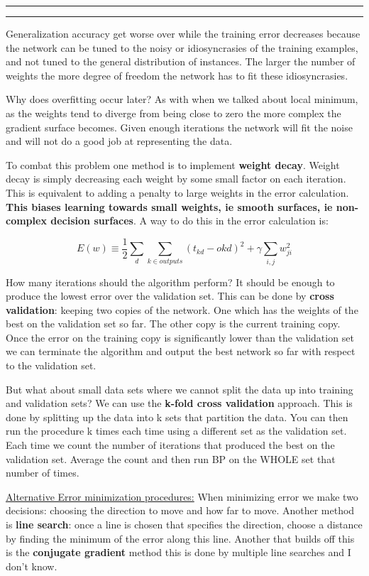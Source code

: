 \documentclass[11pt]{article}
\newcounter{questionCounter}
\newcounter{partCounter}[questionCounter]
\newenvironment{question}[2][\arabic{questionCounter}]{%
    \addtocounter{questionCounter}{1}%
    \setcounter{partCounter}{0}%
    \vspace{.25in} \hrule \vspace{0.5em}%
        \noindent{\bf #1: #2}%
    \vspace{0.8em} \hrule \vspace{.10in}%
}{}
\begin{document}
\begin{question}{Artificial Neural Networks: }
Generalization accuracy get worse over while the training error decreases because the network
can be tuned to the noisy or idiosyncrasies of the training examples, and not tuned to the general
distribution of instances. The larger the number of weights the more degree of freedom the network
has to fit these idiosyncrasies.

Why does overfitting occur later? As with when we talked about local minimum, as the weights tend to
diverge from being close to zero the more complex the gradient surface becomes. Given enough iterations
the network will fit the noise and will not do a good job at representing the data.

To combat this problem one method is to implement \textbf{weight decay}. Weight decay is simply decreasing each
weight by some small factor on each iteration. This is equivalent to adding a penalty to large weights in
the error calculation. \textbf{This biases learning towards small weights, ie smooth surfaces, ie non-complex
decision surfaces}. A way to do this in the error calculation is:





$$E(w) \equiv \frac{1}{2} \displaystyle\sum\limits_{d} \displaystyle\sum\limits_{k\in outputs}(t_{kd} - o{kd})^2 + \gamma
\displaystyle\sum\limits_{i,j}w_{ji}^2$$

How many iterations should the algorithm perform? It should be enough to produce the lowest error over
the validation set. This can be done by \textbf{cross validation}: keeping two copies of the network. One which has the weights of
the best on the validation set so far. The other copy is the current training copy. Once the error
on the training copy is significantly lower than the validation set we can terminate the algorithm
and output the best network so far with respect to the validation set.

But what about small data sets where we cannot split the data up into training and validation sets? We can
use the \textbf{k-fold cross validation} approach. This is done by splitting up the data into k sets that
partition the data. You can then run the procedure k times each time using a different set as the validation
set. Each time we count the number of iterations that produced the best on the validation set. Average the 
count and then run BP on the WHOLE set that number of times.

\underline{Alternative Error minimization procedures:}
When minimizing error we make two decisions: choosing the direction to move and how far to move. Another
method is \textbf{line search}: once a line is chosen that specifies the direction, choose a distance by finding
the minimum of the error along this line. Another that builds off this is the \textbf{conjugate gradient} method
this is done by multiple line searches and I don't know.



\end{question}
\end{document}

